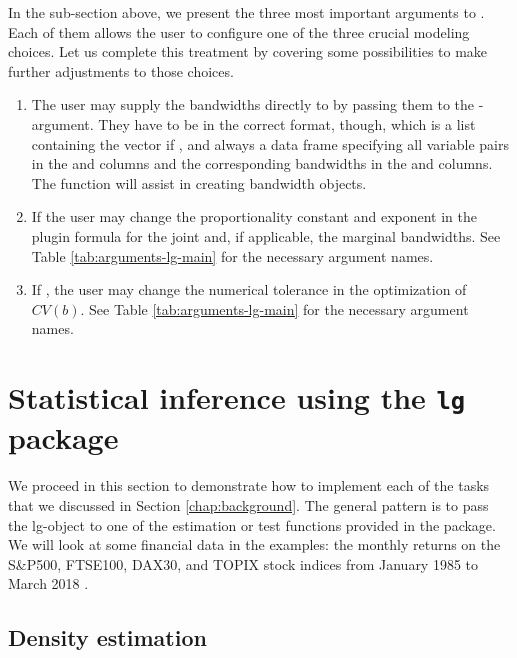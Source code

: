 In the sub-section above, we present the three most important arguments to . Each of them allows the user to configure one of the three crucial modeling choices. Let us complete this treatment by covering some possibilities to make further adjustments to those choices.

\begin{enumerate}
\def\labelenumi{\arabic{enumi}.}
\item
  The user may supply the bandwidths directly to  by passing them to the -argument. They have to be in the   correct format, though, which is a list containing the vector  if , and always a data frame  specifying all variable pairs in the  and  columns and the corresponding bandwidths
  in the  and  columns. The function  will assist in creating bandwidth objects.
\item
  If  the user may change the proportionality constant and exponent in the plugin formula for the joint and, if applicable, the marginal bandwidths. See Table \ref{tab:arguments-lg-main} for the necessary argument names.
\item
  If , the user may change the numerical tolerance in the optimization of \(CV\left(b\right)\). See Table \ref{tab:arguments-lg-main} for the necessary argument names.
\end{enumerate}

\section{Statistical inference using the \texttt{lg} package}
\label{chap:inference}

We proceed in this section to demonstrate how to implement each of the tasks that we discussed in Section \ref{chap:background}. The general pattern is to pass the lg-object to one of the estimation or test functions provided in the  package. We will look at some financial data in the examples: the monthly returns on the S\&P500, FTSE100, DAX30, and TOPIX stock indices from January 1985 to March 2018 \citep{datastream}. 

\subsection{Density estimation}\label{chap:density}

